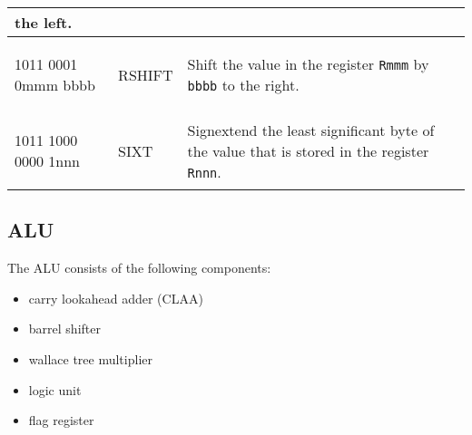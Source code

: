 \documentclass{report}
\newcommand{\boxchar}[1]{\begin{boxednumbers} #1
\end{boxednumbers}}
\begin{document}
\begin{center}
\begin{longtable}{m{}m{}m{}}
                                                    the left.\\
                                                    \hline
        \boxchar{1011 0001 0mmm bbbb} & RSHIFT    & Shift the value in the register
                                                    \texttt{Rmmm} by \texttt{bbbb} to
                                                    the right.\\
                                                    \hline
        \boxchar{1011 1000 0000 1nnn} & SIXT      & Signextend the least significant
                                                    byte of the value that is stored
                                                    in the register \texttt{Rnnn}.\\
                                                    \hline
    \end{longtable}
\end{center}
\subsection*{ALU}
The ALU consists of the following components:
\begin{itemize}
    \item carry lookahead adder (CLAA)
    \item barrel shifter
    \item wallace tree multiplier
    \item logic unit
    \item flag register
\end{itemize}
\end{document}
